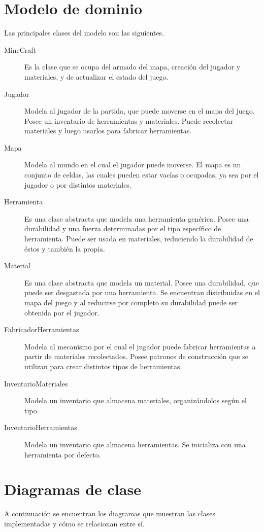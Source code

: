 \documentclass[titlepage,a4paper]{article}
\begin{document}
\section{Modelo de dominio}\label{sec:modelo}
Las principales clases del modelo son las siguientes.
\begin{description}
\item[MineCraft] Es la clase que se ocupa del armado del mapa, creación del jugador y materiales, y de actualizar el estado del juego.
\item[Jugador] Modela al jugador de la partida, que puede moverse en el mapa del juego. Posee un inventario de herramientas y materiales. Puede recolectar materiales y luego usarlos para fabricar herramientas.
\item[Mapa] Modela al mundo en el cual el jugador puede moverse. El mapa es un conjunto de celdas, las cuales pueden estar vacías o ocupadas, ya sea por el jugador o por distintos materiales.
\item[Herramienta] Es una clase abstracta que modela una herramienta genérica. Posee una durabilidad y una fuerza determinadas por el tipo específico de herramienta. Puede ser usada en materiales, reduciendo la durabilidad de éstos y también la propia.
\item[Material] Es una clase abstracta que modela un material. Posee una durabilidad, que puede ser desgastada por una herramienta. Se encuentran distribuidas en el mapa del juego y al reducirse por completo su durabilidad puede ser obtenida por el jugador.
\item[FabricadorHerramientas] Modela al mecanismo por el cual el jugador puede fabricar herramientas a partir de materiales recolectados. Posee patrones de construcción que se utilizan para crear distintos tipos de herramientas.
\item[InventarioMateriales] Modela un inventario que almacena materiales, organizándolos según el tipo.
\item[InventarioHerramientas] Modela un inventario que almacena herramientas. Se inicializa con una herramienta por defecto.
\end{description}

\section{Diagramas de clase}\label{sec:diagramasdeclase}
A continuación se encuentran los diagramas que muestran las clases implementadas y cómo se relacionan entre sí.
\end{document}

